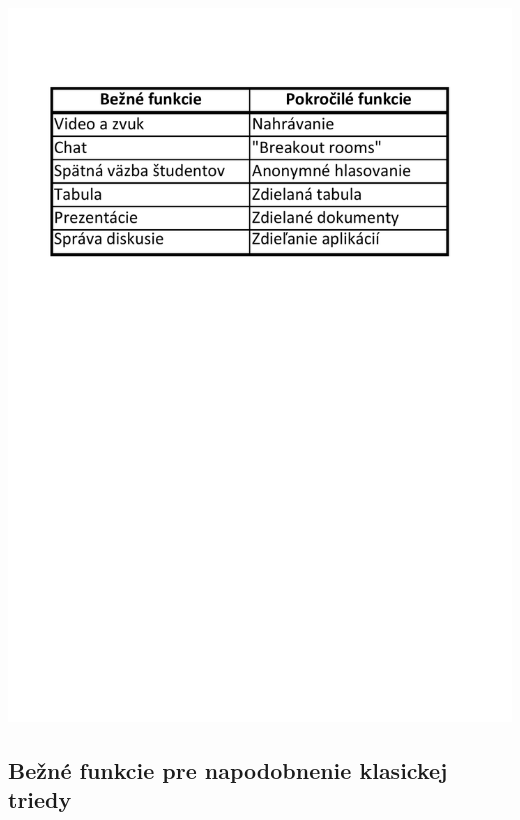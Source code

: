 \documentclass[10pt,twoside,slovak,a4paper]{article}
\begin{document}
\includegraphics[scale=0.5]{tab1.pdf}\label{tab1}



\subsection{Bežné funkcie pre napodobnenie klasickej triedy} \label{Bezne}
\end{document}
